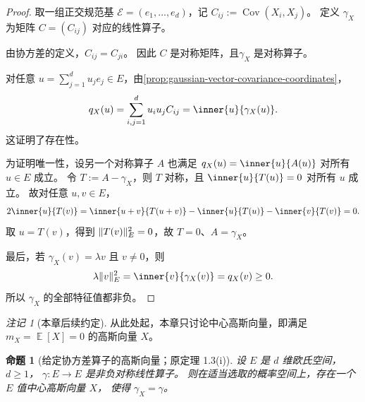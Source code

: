 \documentclass[UTF8,11pt,a4paper,oneside,fontset=fandol]{ctexrep}
\numberwithin{equation}{section}
\theoremstyle{plain}
\newtheorem{proposition}[theorem]{命题}
\theoremstyle{definition}
\theoremstyle{remark}
\newtheorem{remark}[theorem]{注记}
\DeclareMathOperator{\E}{\mathbb{E}}
\DeclareMathOperator{\Cov}{Cov}
\DeclarePairedDelimiter{\norm}{\lVert}{\rVert}
\begin{document}
\begin{proof}
取一组正交规范基 $\mathcal{E}=(e_1,\ldots,e_d)$，记
$C_{ij}:=\Cov(X_i,X_j)$。
定义 $\gamma_X$ 为矩阵 $C=(C_{ij})$ 对应的线性算子。

由协方差的定义，$C_{ij}=C_{ji}$。
因此 $C$ 是对称矩阵，且$\gamma_X$ 是对称算子。

对任意 $u=\sum_{j=1}^{d}u_je_j\in E$，由\cref{prop:gaussian-vector-covariance-coordinates}，
\[
  q_X(u)
  =\sum_{i,j=1}^{d}u_i u_j C_{ij}
  =\inner{u}{\gamma_X(u)}.
\]
这证明了存在性。

为证明唯一性，设另一个对称算子 $A$ 也满足
$q_X(u)=\inner{u}{A(u)}$ 对所有 $u\in E$ 成立。
令 $T:=A-\gamma_X$，则 $T$ 对称，且 $\inner{u}{T(u)}=0$ 对所有 $u$ 成立。
故对任意 $u,v\in E$，
\[
  2\inner{u}{T(v)}
  =\inner{u+v}{T(u+v)}
    -\inner{u}{T(u)}-\inner{v}{T(v)}
  =0.
\]
取 $u=T(v)$，得到 $\norm{T(v)}_E^2=0$，故 $T=0$、$A=\gamma_X$。

最后，若 $\gamma_X(v)=\lambda v$ 且 $v\ne0$，则
\[
  \lambda\norm{v}_E^2
  =\inner{v}{\gamma_X(v)}
  =q_X(v)\ge0.
\]
所以 $\gamma_X$ 的全部特征值都非负。
\end{proof}

\begin{remark}[本章后续约定]
\label{rem:centered-gaussian-convention}
从此处起，本章只讨论中心高斯向量，即满足
$m_X=\E[X]=0$ 的高斯向量 $X$。
\end{remark}

\begin{proposition}[给定协方差算子的高斯向量；原定理 1.3(i)]
\label{prop:gaussian-covariance-existence}
设 $E$ 是 $d$ 维欧氏空间，$d\ge1$，
$\gamma:E\to E$ 是非负对称线性算子。
则在适当选取的概率空间上，存在一个 $E$ 值中心高斯向量 $X$，
使得 $\gamma_X=\gamma$。
\end{proposition}
\end{document}
